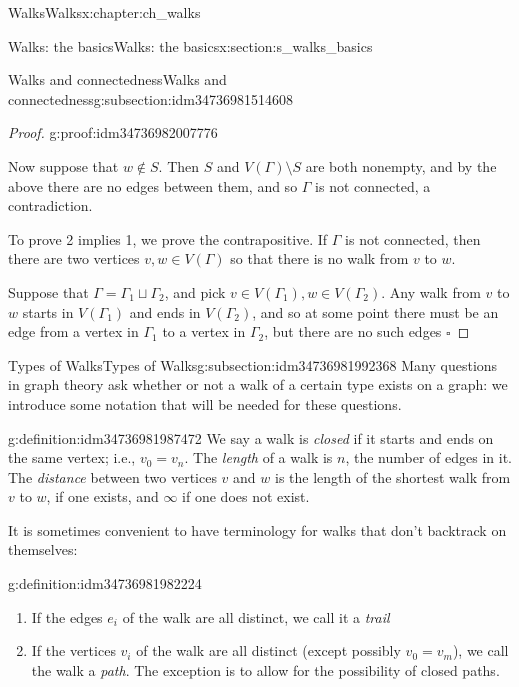 \documentclass[oneside,10pt,]{book}
\numberwithin{equation}{section}
\begin{document}
\begin{chapterptx}{Walks}{}{Walks}{}{}{x:chapter:ch_walks}
\begin{sectionptx}{Walks: the basics}{}{Walks: the basics}{}{}{x:section:s_walks_basics}
\begin{subsectionptx}{Walks and connectedness}{}{Walks and connectedness}{}{}{g:subsection:idm34736981514608}
\begin{proof}{}{g:proof:idm34736982007776}
\par
Now suppose that \(w\notin S\).  Then \(S\) and \(V(\Gamma)\setminus S\) are both nonempty, and by the above there are no edges between them, and so \(\Gamma\) is not connected, a contradiction.%
\par
To prove 2 implies 1, we prove the contrapositive.  If \(\Gamma\) is not connected, then there are two vertices \(v,w\in V(\Gamma)\) so that there is no walk from \(v\) to \(w\).%
\par
Suppose that \(\Gamma=\Gamma_1\sqcup\Gamma_2\), and pick \(v\in V(\Gamma_1), w\in V(\Gamma_2)\).  Any walk from \(v\) to \(w\) starts in \(V(\Gamma_1)\) and ends in \(V(\Gamma_2)\), and so at some point there must be an edge from a vertex in \(\Gamma_1\) to a vertex in \(\Gamma_2\), but there are no such edges \(\square\)%
\end{proof}
\end{subsectionptx}
%
%
\typeout{************************************************}
\typeout{************************************************}
%
\begin{subsectionptx}{Types of Walks}{}{Types of Walks}{}{}{g:subsection:idm34736981992368}
Many questions in graph theory ask whether or not a walk of a certain type exists on a graph: we introduce some notation that will be needed for these questions.%
\begin{definition}{}{g:definition:idm34736981987472}%
We say a walk is \emph{closed} if it starts and ends on the same vertex; i.e., \(v_0=v_n\).  The \emph{length} of a walk is \(n\), the number of edges in it.  The \emph{distance} between two vertices \(v\) and \(w\) is the length of the shortest walk from \(v\) to \(w\), if one exists, and \(\infty\) if one does not exist.%
\end{definition}
It is sometimes convenient to have terminology for walks that don't backtrack on themselves:%
\begin{definition}{}{g:definition:idm34736981982224}%
%
\begin{enumerate}
\item{}If the edges \(e_i\) of the walk are all distinct, we call it a \emph{trail}%
\item{}If the vertices \(v_i\) of the walk are all distinct (except possibly \(v_0=v_m\)), we call the walk a \emph{path}.  The exception is to allow for the possibility of closed paths.%
\end{enumerate}
\end{definition}

\end{subsectionptx}
\end{sectionptx}
\end{chapterptx}
\end{document}
